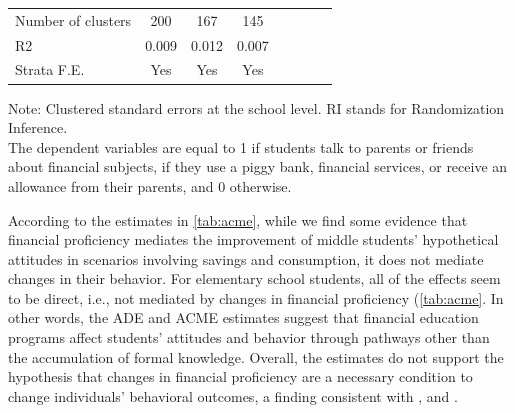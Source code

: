 \begin{table}[h!]
\begin{threeparttable}
\begin{tabular}{lccclccc}
Number of clusters &        200 &        167 &        145 &            &            &            &            \\

        R2 &      0.009 &      0.012 &      0.007 &            &            &            &            \\

Strata F.E. &        Yes &        Yes &        Yes &            &            &            &            \\
\hline
\end{tabular}  
\label{tab:ITT_beha}
\begin{tablenotes}
    \fontsize{9}{9}\selectfont 
    \item Note: Clustered standard errors at the school level. RI stands for Randomization Inference. \\
    The dependent variables are equal to 1 if students talk to parents or friends about financial subjects, if they use a piggy bank, financial services, or receive an allowance from their parents, and 0 otherwise. 
\end{tablenotes} 
\end{threeparttable}
\end{table}%




According to the estimates in \autoref{tab:acme}, while we find some evidence that financial proficiency mediates the improvement of middle students' hypothetical attitudes in scenarios involving savings and consumption, it does not mediate changes in their behavior. For elementary school students, all of the effects seem to be direct, i.e., not mediated by changes in financial proficiency (\autoref{tab:acme}. In other words, the ADE and ACME estimates suggest that financial education programs affect students' attitudes and behavior through pathways other than the accumulation of formal knowledge. Overall, the estimates do not support the hypothesis that changes in financial proficiency are a necessary condition to change individuals' behavioral outcomes, a finding consistent with \cite{carpena2018causal}, and \cite{de2021effect}.  


